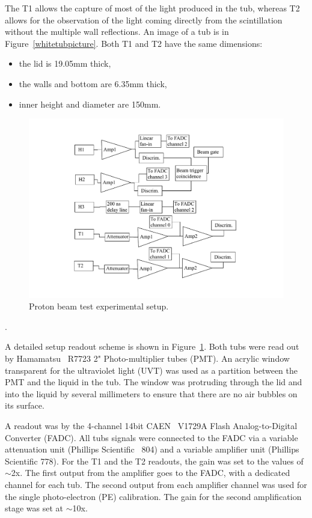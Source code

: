 \documentclass[preprint,12pt]{elsarticle}
\begin{document}
The T1 allows the capture of most of the light produced in the tub, whereas T2 allows for the observation of the light coming directly from the scintillation without the multiple wall reflections. An image of a tub is in Figure~\ref{whitetubpicture}. Both T1 and T2 have the same dimensions:

\begin{itemize}
	\item the lid is 19.05mm thick,
	\item the walls and bottom are 6.35mm thick,
	\item inner height and diameter are 150mm.
\end{itemize}

\begin{figure}[ht]
\centering
\includegraphics[width=130mm]{beamtestschematics.pdf}
\caption{Proton beam test experimental setup.} \label{experimentalsetup2}
\end{figure}.

A detailed setup readout scheme is shown in Figure~\ref{experimentalsetup2}. Both tubs were read out by Hamamatsu~\cite{hamamatsu} R7723 2"  Photo-multiplier tubes (PMT). An acrylic window transparent for the ultraviolet light (UVT) was used as a partition between the PMT and the liquid in the tub. The window was protruding through the lid and into the liquid by several millimeters to ensure that there are no air bubbles on its surface.

A readout was by the 4-channel 14bit CAEN~\cite{caen} V1729A Flash Analog-to-Digital Converter (FADC). All tubs signals were connected to the FADC via a variable attenuation unit (Phillips Scientific~\cite{phillips} 804) and a variable amplifier unit (Phillips Scientific 778). For the T1 and the T2 readouts, the gain was set to the values of $\sim$2x. The first output from the amplifier goes to the FADC, with a dedicated channel for each tub. The second output from each amplifier channel was used for the single photo-electron (PE) calibration. The gain for the second amplification stage was set at $\sim$10x.
\end{document}
